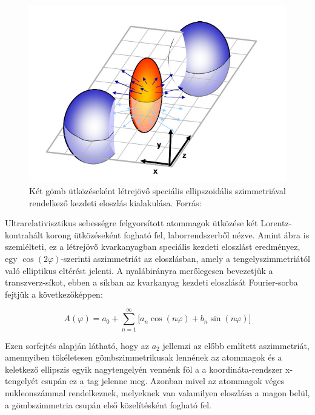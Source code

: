 \documentclass[10pt,a4paper]{article}
\numberwithin{equation}{subsection}
\numberwithin{figure}{section}
\begin{document}
\begin{center}
\begin{figure}[H]
\centering
\includegraphics[scale=0.6]{pic/int/p2}
\caption{Két gömb ütközéseként létrejövő speciális ellipszoidális szimmetriával rendelkező kezdeti eloszlás kialakulása. Forrás: ~\cite{CsanadHabil}
}
\label{fig:ellip}
\end{figure}
\end{center}



Ultrarelativisztikus sebességre felgyorsított atommagok ütközése két Lorentz-kontrahált korong ütközéseként fogható fel, laborrendszerből nézve. Amint  ábra is szemlélteti, ez a létrejövő kvarkanyagban speciális kezdeti eloszlást eredményez, egy $\cos(2\varphi)$-szerinti aszimmetriát az eloszlásban, amely a tengelyszimmetriától való elliptikus eltérést jelenti.
A nyalábirányra merőlegesen bevezetjük a transzverz-síkot, ebben a síkban az kvarkanyag kezdeti eloszlását Fourier-sorba fejtjük a következőképpen:
\begin{large}
\begin{equation}
A(\varphi)= a_0+\sum_{n=1}^{\infty}\Big[a_n \cos(n\varphi)+b_n \sin(n\varphi)\Big]
\label{eq:e2}
\end{equation}
\end{large}
Ezen sorfejtés alapján látható, hogy az $a_2$ jellemzi az előbb említett aszimmetriát, amennyiben tökéletesen gömbszimmetrikusak lennének az atommagok és a keletkező ellipszis egyik nagytengelyén vennénk föl a a koordináta-rendszer x-tengelyét csupán ez a tag jelenne meg. Azonban mivel az atommagok véges nukleonszámmal rendelkeznek, melyeknek van valamilyen eloszlása a magon belül, a gömbszimmetria csupán első közelítésként fogható fel.
\end{document}
